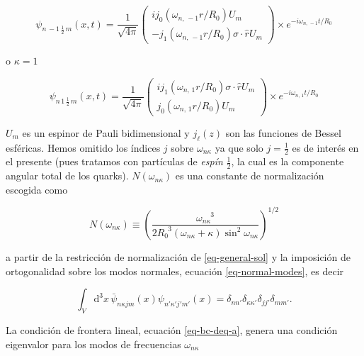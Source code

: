 \begin{equation}\label{eq-deq-sol-k=-1}
{\psi}_{n \, -1 \, \frac{1}{2} \, m} (x,t) = \frac{1}{\sqrt{4 \pi}} 
\left( 
\begin{array}{c}
i {j}_{0} ({\omega}_{n, \, -1} r / {R}_{0}) {U}_{m} \\
- {j}_{1} ({\omega}_{n, \, -1} r / {R}_{0}) \sigma \cdot \hat{r}{U}_{m} 
\end{array}
\right) \times {e}^{- i {\omega}_{n, \, -1} t / {R}_{0}}
\end{equation}

o ${\kappa} = 1$

\begin{equation}\label{eq-deq-sol-k=1}
{\psi}_{n \, 1 \, \frac{1}{2} \, m} (x,t) = \frac{1}{\sqrt{4 \pi}} 
\left( 
\begin{array}{c}
i{j}_{1} ({\omega}_{n, \, 1} r / {R}_{0}) \sigma \cdot \hat{r} {U}_{m} \\
{j}_{0} ({\omega}_{n, \, 1} r / {R}_{0}) {U}_{m} 
\end{array}
\right) \times {e}^{- i {\omega}_{n, \, 1} t / {R}_{0}}
\end{equation}

${U}_{m}$ es un espinor de Pauli bidimensional y ${j}_{\ell}(z)$ son las funciones de Bessel esféricas. Hemos omitido los índices $j$ sobre ${\omega}_{n \kappa}$ ya que solo $j = \frac{1}{2}$ es de interés en el presente (pues tratamos con partículas de \textit{espín} $\frac{1}{2}$, la cual es la componente angular total de los quarks). $N({\omega}_{n \kappa})$ es una constante de normalización escogida como

\begin{equation}
N({\omega}_{n \kappa}) \equiv \left( \frac{{\omega}_{n \kappa}^{\phantom{n \kappa} 3}}{2 {R}_{0}^{\phantom{0} 3} ({\omega}_{n \kappa} + \kappa) \sin^{2} {\omega}_{n \kappa}} \right)^{1/2}
\end{equation}

a partir de la restricción de normalización de \eqref{eq-general-sol} y la imposición de ortogonalidad sobre los modos normales, ecuación \eqref{eq-normal-modes}, es decir

\begin{equation}
    \int_{V} \mathrm{d}^{3} x \, \bar{\psi}_{n \kappa j m} (x) \psi_{n' \kappa' j' m'} (x) = \delta_{n n'} \delta_{\kappa \kappa'} \delta_{j j'} \delta_{m m'}.
\end{equation}

La condición de frontera lineal, ecuación \eqref{eq-bc-deq-a}, genera una condición eigenvalor para los modos de frecuencias ${\omega}_{n \kappa}$

